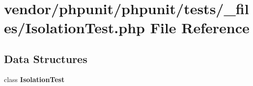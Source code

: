 \section{vendor/phpunit/phpunit/tests/\+\_\+files/\+Isolation\+Test.php File Reference}
\label{_isolation_test_8php}
\subsection*{Data Structures}
\begin{DoxyCompactItemize}
\item 
class {\bf Isolation\+Test}
\end{DoxyCompactItemize}
